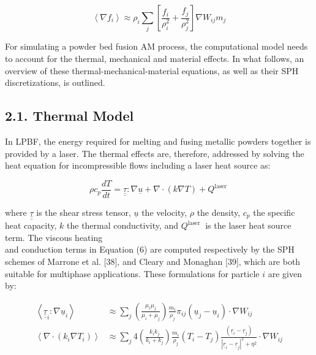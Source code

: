 \documentclass[10pt]{article}
\begin{document}
\begin{equation*}
\left\langle\nabla f_{i}\right\rangle \approx \rho_{i} \sum_{j}\left[\frac{f_{i}}{\rho_{i}^{2}}+\frac{f_{j}}{\rho_{j}^{2}}\right] \nabla W_{i j} m_{j} \tag{5}
\end{equation*}


For simulating a powder bed fusion AM process, the computational model needs to account for the thermal, mechanical and material effects. In what follows, an overview of these thermal-mechanical-material equations, as well as their SPH discretizations, is outlined.

\subsection*{2.1. Thermal Model}
In LPBF, the energy required for melting and fusing metallic powders together is provided by a laser. The thermal effects are, therefore, addressed by solving the heat equation for incompressible flows including a laser heat source as:


\begin{equation*}
\rho c_{p} \frac{d T}{d t}=\underline{\underline{\tau}}: \nabla \underline{u}+\nabla \cdot(k \nabla T)+Q^{\text {laser }} \tag{6}
\end{equation*}


where $\underline{\underline{\tau}}$ is the shear stress tensor, $\underline{u}$ the velocity, $\rho$ the density, $c_{p}$ the specific heat capacity, $k$ the thermal conductivity, and $Q^{\text {laser }}$ is the laser heat source term. The viscous heating\\
and conduction terms in Equation (6) are computed respectively by the SPH schemes of Marrone et al. [38], and Cleary and Monaghan [39], which are both suitable for multiphase applications. These formulations for particle $i$ are given by:


\begin{align*}
\left\langle\underline{\underline{\tau}}_{i}: \nabla \underline{u}_{i}\right\rangle & \approx \sum_{j}\left(\frac{\mu_{i} \mu_{j}}{\mu_{i}+\mu_{j}}\right) \frac{m_{i}}{\rho_{j}} \pi_{i j}\left(\underline{u}_{j}-\underline{u}_{i}\right) \cdot \nabla W_{i j}  \tag{7}\\
\left\langle\nabla \cdot\left(k_{i} \nabla T_{i}\right)\right\rangle & \approx \sum_{j} 4\left(\frac{k_{i} k_{j}}{k_{i}+k_{j}}\right) \frac{m_{i}}{\rho_{j}}\left(T_{i}-T_{j}\right) \frac{\left(\underline{r}_{i}-\underline{r}_{j}\right)}{\left|\underline{r}_{i}-\underline{r}_{j}\right|^{2}+\eta^{2}} \cdot \nabla W_{i j} \tag{8}
\end{align*}
\end{document}
